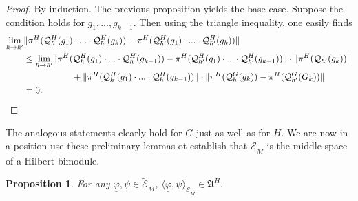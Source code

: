 \documentclass[sn-mathphys,Numbered]{sn-jnl}
\newtheorem{proposition}[theorem]{Proposition}%
\providecommand{\norm}[1]{\lVert#1\rVert}
\providecommand{\inner}[2]{\langle#1,#2\rangle}
\begin{document}
\begin{proof}
    By induction.  The previous proposition yields the base case.  Suppose the condition holds for $g_1,...,g_{k-1}$.  Then using the triangle inequality, one easily finds
    \begin{align}
        \lim_{\hbar\to\hbar'}&\norm{\pi^H(\mathcal{Q}_\hbar^H(g_1)\cdot...\cdot\mathcal{Q}_\hbar^H(g_k)) - \pi^H(\mathcal{Q}_{\hbar'}^H(g_1)\cdot...\cdot \mathcal{Q}_{\hbar'}^H(g_k))}\\
        &\leq\lim_{\hbar\to\hbar'}\norm{\pi^H(\mathcal{Q}_\hbar^H(g_1)\cdot...\cdot\mathcal{Q}_\hbar^H(g_{k-1})) - \pi^H(\mathcal{Q}_{\hbar'}^H(g_1)\cdot...\cdot\mathcal{Q}_{\hbar'}^H(g_{k-1}))}\cdot\norm{\pi^H(\mathcal{Q}_{\hbar'}(g_k))}\\
       & \hspace{.75in} + \norm{\pi^H(\mathcal{Q}_\hbar^H(g_1)\cdot...\cdot\mathcal{Q}_\hbar^H(g_{k-1}))}\cdot \norm{\pi^H(\mathcal{Q}_\hbar^G(g_k)) - \pi^H(\mathcal{Q}_{\hbar'}^G(G_k))}\\
        &=0.
    \end{align}
\end{proof}

The analogous statements clearly hold for $G$ just as well as for $H$.  We are now in a position use these preliminary lemmas ot establish that $\underline{\mathcal{E}}_M$ is the middle space of a Hilbert bimodule.\bigskip

\begin{proposition}
      For any $\underline{\varphi},\underline{\psi}\in\widetilde{\underline{\mathcal{E}}}_M$, $\inner{\underline{\varphi}}{\underline{\psi}}_{\underline{\mathcal{E}}_M}\in\mathfrak{A}^H.$ 
\end{proposition}
\end{document}
